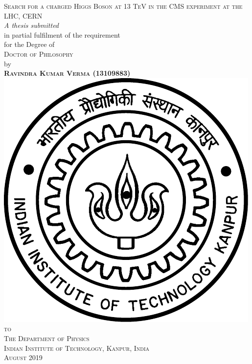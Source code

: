 \begin{singlespace}
\begin{titlepage} 
\begin{center}
{\Huge\textsc {Search for a charged Higgs Boson at 13 TeV in the CMS experiment at the LHC, CERN}
\\[.5in]} 
{\large \textit{A thesis submitted}\\[0.1in] in partial fulfilment of the requirement\\[0.1in] for the Degree of\\[0.1in] \textsc{ Doctor of Philosophy}\\[0.5in]}
by\\ {\large \textbf{\textsc{Ravindra Kumar Verma} (13109883)}}\\[0.9in]
\includegraphics[scale=0.50]{University/Image/IIT_Kanpur_Logo}\\[0.9in]
{\Large \textsc{to} \\ \textsc{The Department of Physics}\\\textsc{Indian Institute of
	Technology, Kanpur, India}\\[.5in]}
{\Large \textsc{August} 2019}
\end{center}
\end{titlepage} 
\end{singlespace}

